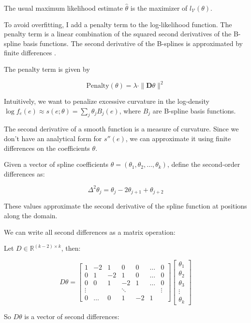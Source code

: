 \documentclass[
  12pt]{article}
\theoremstyle{definition}
\theoremstyle{remark}
\begin{document}
The usual maximum likelihood estimate \(\hat{\theta}\) is the maximizer
of \(l_{\mathcal{V}}(\theta)\).

To avoid overfitting, I add a penalty term to the log-likelihood
function. The penalty term is a linear combination of the squared second
derivatives of the B-spline basis functions. The second derivative of
the B-splines is approximated by finite differences \citep{Eilers1996}.

The penalty term is given by

\[
\text{Penalty}(\theta) = \lambda \cdot \|\mathbf{D}\theta \|^2
\]

Intuitively, we want to penalize excessive curvature in the log-density
\(\log f_e(e) \approx s(e; \theta) = \sum_j \theta_j B_j(e)\), where
\(B_j\) are B-spline basis functions.

The second derivative of a smooth function is a measure of curvature.
Since we don't have an analytical form for \(s''(e)\), we can
approximate it using finite differences on the coefficients \(\theta\).

Given a vector of spline coefficients
\(\theta = (\theta_1, \theta_2, \ldots, \theta_k)\), define the
second-order differences as:

\[
\Delta^2 \theta_j = \theta_j - 2\theta_{j+1} + \theta_{j+2}
\]

These values approximate the second derivative of the spline function at
positions along the domain.

We can write all second differences as a matrix operation:

Let \(D \in \mathbb{R}^{(k-2) \times k}\), then:

\[
D \theta = 
\begin{bmatrix}
1 & -2 & 1 & 0 & 0 & \dots & 0 \\
0 & 1 & -2 & 1 & 0 & \dots & 0 \\
0 & 0 & 1 & -2 & 1 & \dots & 0 \\
\vdots & & & \ddots & & & \vdots \\
0 & \dots & 0 & 1 & -2 & 1
\end{bmatrix}
\begin{bmatrix}
\theta_1 \\
\theta_2 \\
\theta_3 \\
\vdots \\
\theta_k
\end{bmatrix}
\]

So \(D \theta\) is a vector of second differences:
\end{document}
